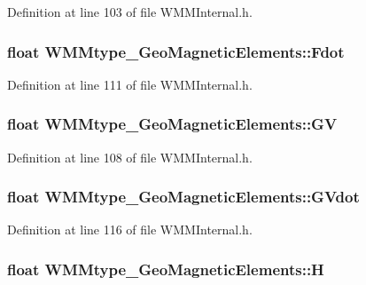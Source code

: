 Definition at line 103 of file W\-M\-M\-Internal.\-h.

\hypertarget{struct_w_m_mtype___geo_magnetic_elements_aaff92c0324d3a717abc215245cbd5238}{
\subsubsection[{Fdot}]{\setlength{\rightskip}{0pt plus 5cm}float W\-M\-Mtype\-\_\-\-Geo\-Magnetic\-Elements\-::\-Fdot}}\label{struct_w_m_mtype___geo_magnetic_elements_aaff92c0324d3a717abc215245cbd5238}


Definition at line 111 of file W\-M\-M\-Internal.\-h.

\hypertarget{struct_w_m_mtype___geo_magnetic_elements_aa1d50824f5887167ee93d075222f9deb}{
\subsubsection[{G\-V}]{\setlength{\rightskip}{0pt plus 5cm}float W\-M\-Mtype\-\_\-\-Geo\-Magnetic\-Elements\-::\-G\-V}}\label{struct_w_m_mtype___geo_magnetic_elements_aa1d50824f5887167ee93d075222f9deb}


Definition at line 108 of file W\-M\-M\-Internal.\-h.

\hypertarget{struct_w_m_mtype___geo_magnetic_elements_ab653a08b7f24f25dd253ff9f16f3b01e}{
\subsubsection[{G\-Vdot}]{\setlength{\rightskip}{0pt plus 5cm}float W\-M\-Mtype\-\_\-\-Geo\-Magnetic\-Elements\-::\-G\-Vdot}}\label{struct_w_m_mtype___geo_magnetic_elements_ab653a08b7f24f25dd253ff9f16f3b01e}


Definition at line 116 of file W\-M\-M\-Internal.\-h.

\hypertarget{struct_w_m_mtype___geo_magnetic_elements_ae3c575b310c43b133f83cf6bd3b14cfe}{
\subsubsection[{H}]{\setlength{\rightskip}{0pt plus 5cm}float W\-M\-Mtype\-\_\-\-Geo\-Magnetic\-Elements\-::\-H}}\label{struct_w_m_mtype___geo_magnetic_elements_ae3c575b310c43b133f83cf6bd3b14cfe}


